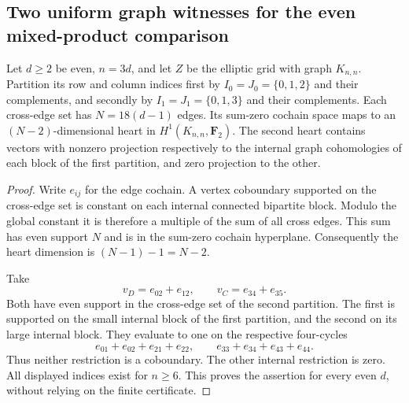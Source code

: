 \subsection{Two uniform graph witnesses for the even mixed-product comparison}
\begin{lemma}\label{lem:root-even-mixed-grid-witnesses-candidate}
Let $d\ge2$ be even, $n=3d$, and let $Z$ be the elliptic grid
with graph $K_{n,n}$. Partition its row and column indices first
by $I_0=J_0=\{0,1,2\}$ and their complements, and secondly by
$I_1=J_1=\{0,1,3\}$ and their complements.
Each cross-edge set has $N=18(d-1)$ edges. Its sum-zero
cochain space maps to an $(N-2)$-dimensional heart in
$H^1(K_{n,n},\mathbf F_2)$.
The second heart contains vectors with nonzero projection
respectively to the internal graph cohomologies of each
block of the first partition, and zero projection to the other.
\end{lemma}
\begin{proof}
Write $e_{ij}$ for the edge cochain. A vertex coboundary
supported on the cross-edge set is constant on each internal
connected bipartite block. Modulo the global constant it is
therefore a multiple of the sum of all cross edges. This sum
has even support $N$ and is in the sum-zero cochain hyperplane.
Consequently the heart dimension is $(N-1)-1=N-2$.

Take
\[
 v_D=e_{02}+e_{12},\qquad v_C=e_{34}+e_{35}.
\]
Both have even support in the cross-edge set of the second
partition. The first is supported on the small internal
block of the first partition, and the second on its large
internal block. They evaluate to one on the respective
four-cycles
\[
 e_{01}+e_{02}+e_{21}+e_{22},\qquad
 e_{33}+e_{34}+e_{43}+e_{44}.
\]
Thus neither restriction is a coboundary. The other internal
restriction is zero. All displayed indices exist for $n\ge6$.
This proves the assertion for every even $d$, without relying
on the finite certificate.
\end{proof}

